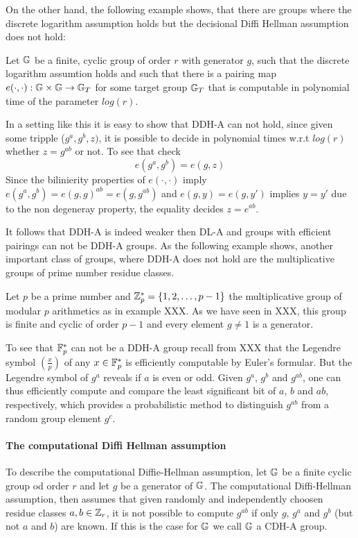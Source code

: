 On the other hand, the following example shows, that there are groups where the discrete logarithm assumption holds but the decisional Diffi Hellman assumption does not hold:
\begin{example} Let $\mathbb{G}$ be a finite, cyclic group of order $r$ with generator $g$, such that the discrete logarithm assumtion holds and such that there is a pairing map $e(\cdot,\cdot): \mathbb{G} \times \mathbb{G} \to \mathbb{G}_T$ for some target group $\mathbb{G}_T$ that is computable in polynomial time of the parameter $log(r)$. 

In a setting like this it is easy to show that DDH-A can not hold, since given some tripple ($ g^a , g^b , z )$, it is possible to decide in polynomial times w.r.t $log(r)$ whether $z=g^{ab}$ or not. To see that check 
$$
e(g^a,g^b)=e(g,z)
$$Since the bilinierity properties of $e(\cdot,\cdot)$ imply $e(g^a,g^b)= e(g,g)^{ab}= e(g,g^{ab})$ and $e(g,y)=e(g,y')$ implies $y=y'$ due to the non degeneray property, the equality decides $z=e^{ab}$.
\end{example} 
It follows that DDH-A is indeed weaker then DL-A and groups with efficient pairings can not be DDH-A groups. As the following example shows, another important class of groups, where DDH-A does not hold are the multiplicative groups of prime number residue classes.
\begin{example}Let $p$ be a prime number and $\mathbb{Z}_p^*=\{1,2,\ldots,p-1\}$ the multiplicative group of modular $p$ arithmetics as in example XXX. As we have seen in XXX, this group is finite and cyclic of order $p-1$ and every element $g\neq 1$ is a generator.

To see that $\mathbb{F}_p^*$ can not be a DDH-A group recall from XXX that the Legendre symbol $\left(\frac{x}{p}\right)$ of any $x\in \mathbb{F}_p^*$ is efficiently computable by Euler's formular. But the  Legendre symbol of $g^{a}$ reveals if $a$ is even or odd. Given $g^{a}$, $g^{b}$ and $g^{ab}$, one can thus efficiently compute and compare the least significant bit of $a$, $b$ and $a b$, respectively, which provides a probabilistic method to distinguish $g^{ab}$ from a random group element $g^c$. 
\end{example}
\paragraph{The computational Diffi Hellman assumption}
To describe the computational Diffie-Hellman assumption, let $\mathbb{G}$ be a finite cyclic group od order $r$ and let $g$ be a generator of $\mathbb{G}$. The computational Diffi-Hellman assumption, then assumes that given randomly and independently choosen residue classes $a,b\in\mathbb{Z}_r$, it is not possible to compute $g^{ab}$ if only $g$, $g^a$ and $g^b$ (but not $a$ and $b$) are known. If this is the case for $\mathbb{G}$ we call $\mathbb{G}$ a CDH-A group.


